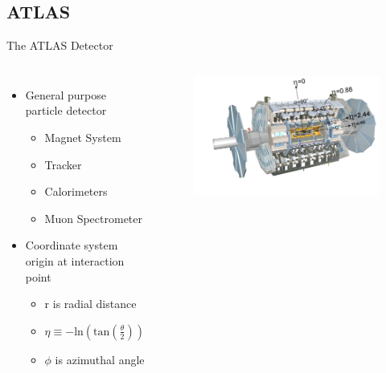 \documentclass[aspectratio=169,xcolor=table]{beamer}
\begin{document}
  \subsection{ATLAS }

    \begin{frame}[t]{The ATLAS Detector}
      \begin{columns}[t]
        \begin{itemize}
          \item General purpose particle detector
            \begin{itemize}
              \item Magnet System
              \item Tracker
              \item Calorimeters
              \item Muon Spectrometer
            \end{itemize}
          \item Coordinate system origin at interaction point
          \begin{itemize}
            \item r is radial distance
            \item $\eta \equiv - \mathrm{ln}(\mathrm{tan}(\frac{\theta}{2}))$
            \item $\phi$ is azimuthal angle
          \end{itemize}
        \end{itemize}

        \begin{figure}
        \begin{centering}
        \includegraphics[width=\textwidth,keepaspectratio=true]{ATLAS_Full_Diagram.jpg}
        \end{centering}
        \caption{\tiny \cite{atlas-schematics} \cite{pseudorapidity}}
        \end{figure}
      \end{columns}
    \end{frame}
\end{document}
